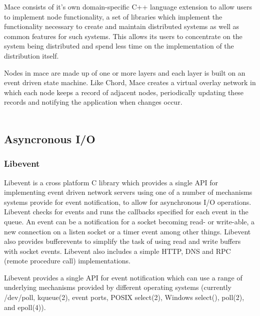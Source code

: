 \documentclass{article}
\begin{document}
Mace consists of it's own domain-specific C++ language extension to allow users to implement node functionality, a set of libraries which implement the functionality necessary to create and maintain distributed systems as well as common features for such systems. This allows its users to concentrate on the system being distributed and spend less time on the implementation of the distribution itself.

Nodes in mace are made up of one or more layers and each layer is built on an event driven state machine. Like Chord, Mace creates a virtual overlay network in which each node keeps a record of adjacent nodes, periodically updating these records and notifying the application when changes occur.
\\
\\

\subsection{Asyncronous I/O}

\subsubsection{Libevent}
Libevent\cite{libevent} is a cross platform C library which provides a single API for implementing event driven network servers using one of a number of mechanisms systems provide for event notification, to allow for asynchronous I/O operations. Libevent checks for events and runs the callbacks specified for each event in the queue. An event can be a notification for a socket becoming read- or write-able, a new connection on a listen socket or a timer event among other things. Libevent also provides bufferevents to simplify the task of using read and write buffers with socket events. Libevent also includes a simple HTTP, DNS and RPC (remote procedure call) implementations.

Libevent provides a single API for event notification which can use a range of underlying mechanisms provided by different operating systems (currently /dev/poll, kqueue(2), event ports, POSIX select(2), Windows select(), poll(2), and epoll(4)).
\end{document}

